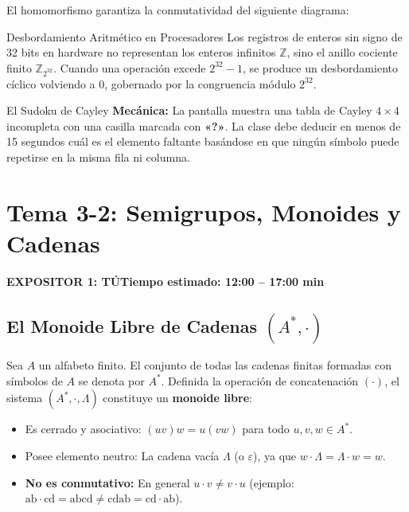 \documentclass[11pt,a4paper]{article}
\newcommand{\badgeTu}{\colorbox{exp1bg}{\textcolor{exp1fg}{\bfseries\sffamily\footnotesize EXPOSITOR 1: TÚ}}}
\begin{document}
El homomorfismo garantiza la conmutatividad del siguiente diagrama:
\begin{center}
\end{center}

\begin{aplicacion}{Desbordamiento Aritmético en Procesadores}
Los registros de enteros sin signo de 32 bits en hardware no representan los enteros infinitos $\mathbb{Z}$, sino el anillo cociente finito $\mathbb{Z}_{2^{32}}$. Cuando una operación excede $2^{32}-1$, se produce un desbordamiento cíclico volviendo a $0$, gobernado por la congruencia módulo $2^{32}$.
\end{aplicacion}

\begin{minijuego}{El Sudoku de Cayley}
\textbf{Mecánica:} La pantalla muestra una tabla de Cayley $4 \times 4$ incompleta con una casilla marcada con \textbf{«?»}. La clase debe deducir en menos de 15 segundos cuál es el elemento faltante basándose en que ningún símbolo puede repetirse en la misma fila ni columna.
\end{minijuego}

\newpage

\section{Tema 3-2: Semigrupos, Monoides y Cadenas}
\noindent\badgeTu \hfill \textbf{Tiempo estimado: 12:00 -- 17:00 min}

\subsection{El Monoide Libre de Cadenas $(A^*, \cdot)$}
\begin{definicion}
Sea $A$ un alfabeto finito. El conjunto de todas las cadenas finitas formadas con símbolos de $A$ se denota por $A^*$. Definida la operación de concatenación $(\cdot)$, el sistema $(A^*, \cdot, \Lambda)$ constituye un \textbf{monoide libre}:
\begin{itemize}[noitemsep]
  \item Es cerrado y asociativo: $(uv)w = u(vw)$ para todo $u, v, w \in A^*$.
  \item Posee elemento neutro: La cadena vacía $\Lambda$ (o $\varepsilon$), ya que $w \cdot \Lambda = \Lambda \cdot w = w$.
  \item \textbf{No es conmutativo:} En general $u \cdot v \neq v \cdot u$ (ejemplo: $\text{ab} \cdot \text{cd} = \text{abcd} \neq \text{cdab} = \text{cd} \cdot \text{ab}$).
\end{itemize}
\end{definicion}
\end{document}
